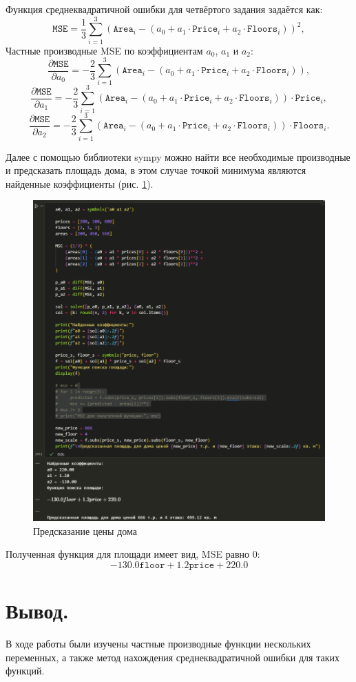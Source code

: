 \documentclass[14pt,a4paper]{extarticle}
\begin{document}
Функция среднеквадратичной ошибки для четвёртого задания задаётся как:
\[
\mathtt{MSE} = \frac{1}{3} \sum_{i=1}^3 \left( \mathtt{Area}_i - (a_0 + a_1 \cdot \mathtt{Price}_i + a_2 \cdot \mathtt{Floors}_i) \right)^2,
\]
Частные производные MSE по коэффициентам $a_0$, $a_1$ и $a_2$:
\[
\frac{\partial \mathtt{MSE}}{\partial a_0} = -\frac{2}{3} \sum_{i=1}^3 \left( \mathtt{Area}_i - (a_0 + a_1 \cdot \mathtt{Price}_i + a_2 \cdot \mathtt{Floors}_i) \right),
\]
\[
\frac{\partial \mathtt{MSE}}{\partial a_1} = -\frac{2}{3} \sum_{i=1}^3 \left( \mathtt{Area}_i - (a_0 + a_1 \cdot \mathtt{Price}_i + a_2 \cdot \mathtt{Floors}_i) \right) \cdot \mathtt{Price}_i,
\]
\[
\frac{\partial \mathtt{MSE}}{\partial a_2} = -\frac{2}{3} \sum_{i=1}^3 \left( \mathtt{Area}_i - (a_0 + a_1 \cdot \mathtt{Price}_i + a_2 \cdot \mathtt{Floors}_i) \right) \cdot \mathtt{Floors}_i.
\]

Далее с помощью библиотеки sympy можно найти все необходимые
производные и предсказать площадь дома,
в этом случае точкой минимума являются найденные коэффициенты (рис. \ref{pic:house}).

\begin{figure}[ht!]
    \centering
    \includegraphics[width=0.7\linewidth]{figures/4.png}
    \caption{Предсказание цены дома}
    \label{pic:house}
\end{figure}

Полученная функция для площади имеет вид, MSE равно 0:
\begin{equation}
    - 130.0 \mathtt{floor} + 1.2 \mathtt{price} + 220.0
\end{equation}

\section*{Вывод.}

В ходе работы были изучены частные производные функции нескольких переменных,
а также метод нахождения среднеквадратичной ошибки для таких функций.
\end{document}
